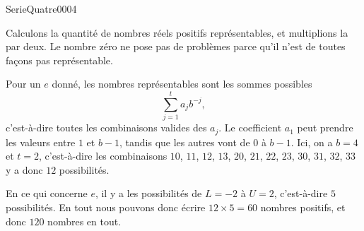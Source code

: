 
\begin{corrige}{SerieQuatre0004}

	Calculons la quantité de nombres réels positifs représentables, et multiplions la par deux. Le nombre zéro ne pose pas de problèmes parce qu'il n'est de toutes façons pas représentable.

	Pour un $e$ donné, les nombres représentables sont les sommes possibles
	\begin{equation}
		\sum_{j=1}^ta_jb^{-j},
	\end{equation}
	c'est-à-dire toutes les combinaisons valides des $a_j$. Le coefficient $a_1$ peut prendre les valeurs entre $1$ et $b-1$, tandis que les autres vont de $0$ à $b-1$. Ici, on a $b=4$ et $t=2$, c'est-à-dire les combinaisons $10$, $11$, $12$, $13$, $20$, $21$, $22$, $23$, $30$, $31$, $32$, $33$ y a donc $12$ possibilités.
	
	En ce qui concerne $e$, il y a les possibilités de $L=-2$ à $U=2$, c'est-à-dire $5$ possibilités. En tout nous pouvons donc écrire $12\times 5=60$ nombres positifs, et donc $120$ nombres en tout.

\end{corrige}
